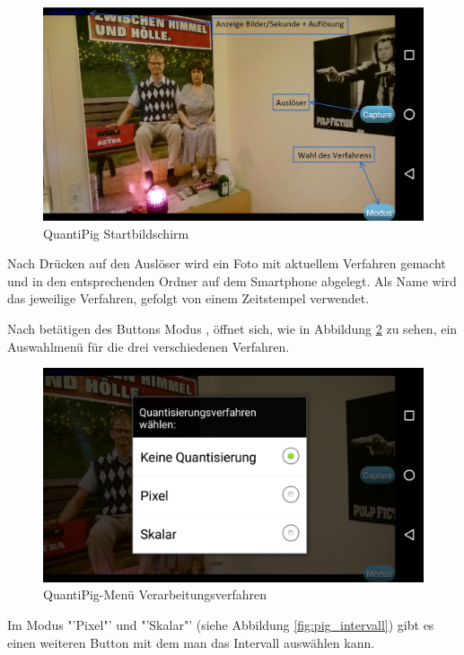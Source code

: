 \begin{description}
\begin{figure}[h]
	\centering
		\includegraphics[width=1.0\textwidth]{img/Startbildschirm_QuantiPig.png}
	\caption[QuantiPig Startbildschirm]{QuantiPig Startbildschirm}
	\label{fig:pig_menue}
\end{figure}

Nach Drücken auf den Auslöser wird ein Foto mit aktuellem Verfahren gemacht und in den entsprechenden Ordner auf dem Smartphone abgelegt. Als Name wird das jeweilige Verfahren, gefolgt von einem Zeitstempel verwendet.

Nach betätigen des Buttons \glqq
Modus\grqq
, öffnet sich, wie in Abbildung \ref{fig:pig_verfahren} zu sehen, ein Auswahlmenü für die drei verschiedenen Verfahren.

\begin{figure}[h!]
	\centering
		\includegraphics[width=1.0\textwidth]{img/Verfahren_QuantiPig.png}
	\caption[QuantiPig-Menü Verarbeitungsverfahren]{QuantiPig-Menü Verarbeitungsverfahren}
	\label{fig:pig_verfahren}
\end{figure}

Im Modus "'Pixel"' und "'Skalar"' (siehe Abbildung \ref{fig:pig_intervall}) gibt es einen weiteren Button mit dem man das Intervall auswählen kann.


\end{description}
